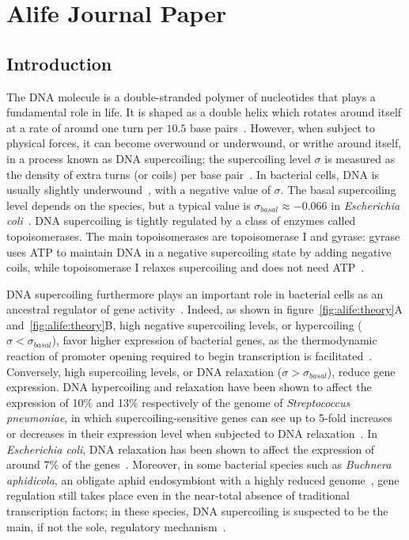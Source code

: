 \chapter{Alife Journal Paper}
\label{chap:alife}

\section{Introduction}
\label{sec:alife:intro}

The DNA molecule is a double-stranded polymer of nucleotides that plays a fundamental role in life.
It is shaped as a double helix which rotates around itself at a rate of around one turn per $10.5$ base pairs~\citep{krogh2018}.
However, when subject to physical forces, it can become overwound or underwound, or writhe around itself, in a process known as DNA supercoiling;
the supercoiling level $\sigma$ is measured as the density of extra turns (or coils) per base pair~\citep{duprey2021}.
In bacterial cells, DNA is usually slightly underwound~\citep{lal2016}, with a negative value of $\sigma$.
The basal supercoiling level depends on the species, but a typical value is $\sigma_{basal} \approx -0.066$ in \emph{Escherichia coli}~\citep{crozat2005}.
DNA supercoiling is tightly regulated by a class of enzymes called topoisomerases.
The main topoisomerases are topoisomerase I and gyrase: gyrase uses ATP to maintain DNA in a negative supercoiling state by adding negative coils, while topoisomerase I relaxes supercoiling and does not need ATP~\citep{martisb.2019}.

DNA supercoiling furthermore plays an important role in bacterial cells as an ancestral regulator of gene activity~\citep{dorman2016}.
Indeed, as shown in figure~\ref{fig:alife:theory}A and~\ref{fig:alife:theory}B, high negative supercoiling levels, or hypercoiling ($\sigma < \sigma_{basal}$), favor higher expression of bacterial genes, as the thermodynamic reaction of promoter opening required to begin transcription is facilitated~\citep{elhoudaigui2019}.
Conversely, high supercoiling levels, or DNA relaxation ($\sigma > \sigma_{basal}$), reduce gene expression.
DNA hypercoiling and relaxation have been shown to affect the expression of 10\% and 13\% respectively of the genome of \emph{Streptococcus pneumoniae}, in which supercoiling-sensitive genes can see up to 5-fold increases or decreases in their expression level when subjected to DNA relaxation~\citep{delacampa2017}.
In \emph{Escherichia coli}, DNA relaxation has been shown to affect the expression of around 7\% of the genes~\citep{peter2004}.
Moreover, in some bacterial species such as \emph{Buchnera aphidicola}, an obligate aphid endosymbiont with a highly reduced genome~\citep{vinuelas2007}, gene regulation still takes place even in the near-total absence of traditional transcription factors; in these species, DNA supercoiling is suspected to be the main, if not the sole, regulatory mechanism~\citep{brinza2013}.

